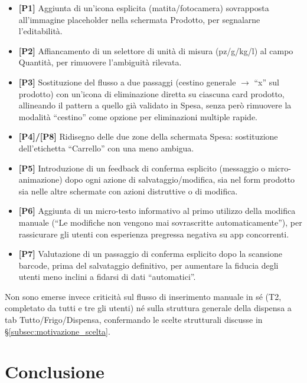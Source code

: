 \documentclass[11pt,a4paper]{article}
\begin{document}
\begin{itemize}
    \item \textbf{[P1]} Aggiunta di un'icona esplicita (matita/fotocamera) sovrapposta all'immagine placeholder nella schermata Prodotto, per segnalarne l'editabilità.
    \item \textbf{[P2]} Affiancamento di un selettore di unità di misura (pz/g/kg/l) al campo Quantità, per rimuovere l'ambiguità rilevata.
    \item \textbf{[P3]} Sostituzione del flusso a due passaggi (cestino generale $\rightarrow$ ``x'' sul prodotto) con un'icona di eliminazione diretta su ciascuna card prodotto, allineando il pattern a quello già validato in Spesa, senza però rimuovere la modalità ``cestino'' come opzione per eliminazioni multiple rapide.
    \item \textbf{[P4]/[P8]} Ridisegno delle due zone della schermata Spesa: sostituzione dell'etichetta ``Carrello'' con una meno ambigua.
    \item \textbf{[P5]} Introduzione di un feedback di conferma esplicito (messaggio o micro-animazione) dopo ogni azione di salvataggio/modifica, sia nel form prodotto sia nelle altre schermate con azioni distruttive o di modifica.
    \item \textbf{[P6]} Aggiunta di un micro-testo informativo al primo utilizzo della modifica manuale (``Le modifiche non vengono mai sovrascritte automaticamente''), per rassicurare gli utenti con esperienza pregressa negativa su app concorrenti.
    \item \textbf{[P7]} Valutazione di un passaggio di conferma esplicito dopo la scansione barcode, prima del salvataggio definitivo, per aumentare la fiducia degli utenti meno inclini a fidarsi di dati ``automatici''.
\end{itemize} 

Non sono emerse invece criticità sul flusso di inserimento manuale in sé (T2, completato da tutti e tre gli utenti) né sulla struttura generale della dispensa a tab Tutto/Frigo/Dispensa, confermando le scelte strutturali discusse in \S\ref{subsec:motivazione_scelta}.

\clearpage
{}
{}
\section*{Conclusione}
\end{document}
